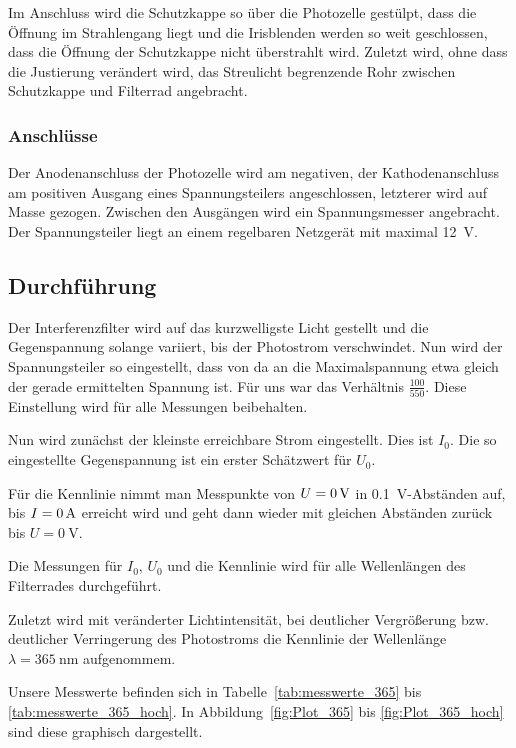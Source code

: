 Im Anschluss wird die Schutzkappe so über die Photozelle gestülpt, dass
die Öffnung im Strahlengang liegt und die Irisblenden werden so weit
geschlossen, dass die Öffnung der Schutzkappe nicht überstrahlt wird.
Zuletzt wird, ohne dass die Justierung verändert wird, das Streulicht
begrenzende Rohr zwischen Schutzkappe und Filterrad angebracht.

\FloatBarrier
\subsubsection{Anschlüsse}

Der Anodenanschluss der Photozelle wird am negativen, der Kathodenanschluss am
positiven Ausgang eines Spannungsteilers angeschlossen, letzterer wird auf
Masse gezogen. Zwischen den Ausgängen wird ein Spannungsmesser angebracht. Der
Spannungsteiler liegt an einem regelbaren Netzgerät mit maximal \SI{12}{\volt}.

\FloatBarrier
\subsection{Durchführung}

Der Interferenzfilter wird auf das kurzwelligste Licht gestellt und die
Gegenspannung solange variiert, bis der Photostrom verschwindet. Nun wird der
Spannungsteiler so eingestellt, dass von da an die Maximalspannung etwa gleich
der gerade ermittelten Spannung ist. Für uns war das Verhältnis
$\frac{100}{550}$. Diese Einstellung wird für alle Messungen
beibehalten.

Nun wird zunächst der kleinste erreichbare Strom eingestellt. Dies ist $I_0$.
Die so eingestellte Gegenspannung ist ein erster Schätzwert für $U_0$.

Für die Kennlinie nimmt man Messpunkte von $U = \SI0{\volt}$ in
\SI{0.1}{\volt}-Abständen auf, bis $I = \SI0{\ampere}$ erreicht wird und geht
dann wieder mit gleichen Abständen zurück bis $U = \SI{0}{\volt}$.

Die Messungen für $I_0$, $U_0$ und die Kennlinie wird für alle Wellenlängen des
Filterrades durchgeführt.

Zuletzt wird mit veränderter Lichtintensität, bei deutlicher Vergrößerung bzw.
deutlicher Verringerung des Photostroms die Kennlinie der Wellenlänge $\lambda
= \SI{365}{\nano\meter}$ aufgenommem.

Unsere Messwerte befinden sich in Tabelle~\ref{tab:messwerte_365} bis
\ref{tab:messwerte_365_hoch}. In Abbildung~\ref{fig:Plot_365} bis
\ref{fig:Plot_365_hoch} sind diese graphisch dargestellt.

